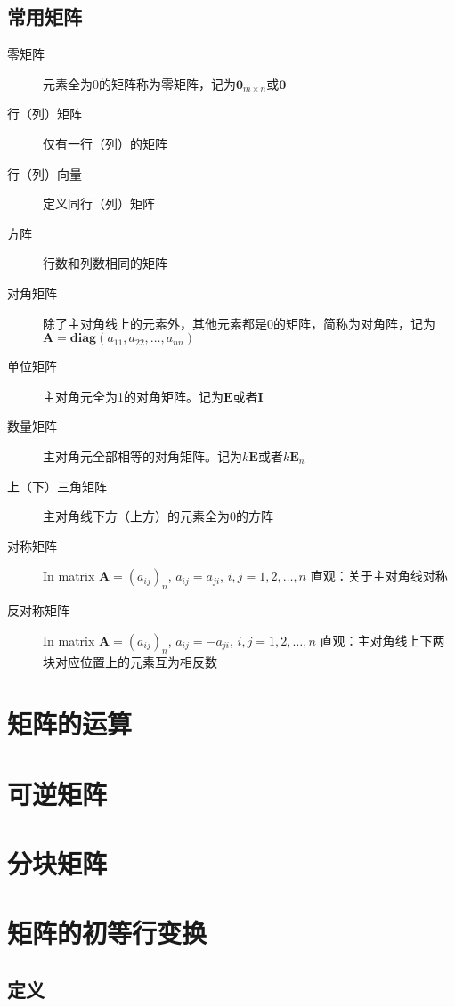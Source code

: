 \documentclass[UTF-8,a4paper]{ctexart}
\begin{document}
\subsection{常用矩阵}
\begin{description}
    \item[零矩阵]{\kaishu 元素全为0的矩阵称为零矩阵，记为\(\mathbf 0_{m\times n}\)或\(\mathbf 0\)}
    \item[行（列）矩阵] {\kaishu 仅有一行（列）的矩阵}
    \item[行（列）向量]{\kaishu 定义同行（列）矩阵} 
    \item[方阵] \kaishu 行数和列数相同的矩阵
    \item[对角矩阵] \kaishu 除了主对角线上的元素外，其他元素都是0的矩阵，简称为对角阵，记为\(\mathbf A = \mathbf{diag}(a_{11},a_{22},\dots ,a_{nn})\)
    \item[单位矩阵] \kaishu 主对角元全为1的对角矩阵。记为\(\mathbf{E}\)或者\(\mathbf{I}\)
    \item[数量矩阵] \kaishu 主对角元全部相等的对角矩阵。记为\( k \mathbf E \)或者\(k\mathbf E_n\)
    \item[上（下）三角矩阵] \kaishu 主对角线下方（上方）的元素全为0的方阵
    \item[对称矩阵] In matrix \(\mathbf{A}=(a_{ij})_n\), \(a_{ij}=a_{ji}\), \(i,j=1,2,\dots ,n\) \newline \kaishu 直观：关于主对角线对称
    \item[反对称矩阵] In matrix \(\mathbf{A}=(a_{ij})_n\), \(a_{ij}=-a_{ji}\), \(i,j=1,2,\dots ,n\) \newline \kaishu 直观：主对角线上下两块对应位置上的元素互为相反数
\end{description}

\section{矩阵的运算}
\section{可逆矩阵}
\section{分块矩阵}


\section{矩阵的初等行变换}

\subsection{定义}
\end{document}
